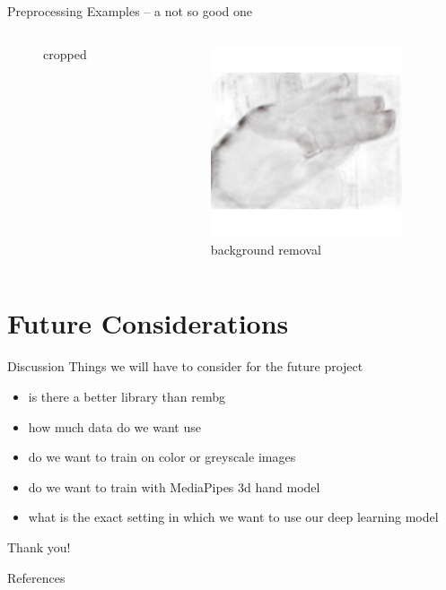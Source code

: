 \documentclass[aspectratio=169]{beamer}
\newcommand{\nologo}{\setbeamertemplate{logo}{}} %
\begin{document}
{\begin{frame}{Preprocessing Examples -- a not so good one}
\begin{columns}[c]
\begin{column}{.33\textwidth}
\begin{figure}
        \caption{cropped}
    \end{figure}
    \end{column}
    
    \begin{column}{.33\textwidth}
    \begin{figure}
        \centering
        \includegraphics[width=0.9\textwidth]{img/rembg/nasmi_304.png}
        \caption{background removal}
    \end{figure}
    \end{column}
\end{columns}
\end{frame}

\section{Future Considerations}
	\begin{frame}{Discussion}
	Things we will have to consider for the future project
	\begin{itemize}
		\item is there a better library than rembg
		\item how much data do we want use
		\item do we want to train on color or greyscale images
		\item do we want to train with MediaPipes 3d hand model
		\item what is the exact setting in which we want to use our deep learning model
	\end{itemize}
	\end{frame}
}



\appendix
{\nologo
	\begin{frame}[standout]
		Thank you!
	\end{frame}

    
	\begin{frame}[allowframebreaks]{References}
	
	
  	
  	

	\end{frame}
}
\end{document}
